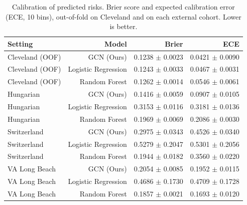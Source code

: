 \begin{table}[t]
\centering
\caption{Calibration of predicted risks. Brier score and expected calibration error (ECE, 10 bins), out-of-fold on Cleveland and on each external cohort. Lower is better.}
\label{tab:calib}
\footnotesize
\begin{tabular}{lrrr}
\toprule
Setting & Model & Brier & ECE \\
\midrule
Cleveland (OOF) & GCN (Ours) & 0.1238 $\pm$ 0.0023 & 0.0421 $\pm$ 0.0090 \\
Cleveland (OOF) & Logistic Regression & 0.1243 $\pm$ 0.0033 & 0.0467 $\pm$ 0.0031 \\
Cleveland (OOF) & Random Forest & 0.1262 $\pm$ 0.0014 & 0.0546 $\pm$ 0.0061 \\
Hungarian & GCN (Ours) & 0.1416 $\pm$ 0.0059 & 0.0907 $\pm$ 0.0105 \\
Hungarian & Logistic Regression & 0.3153 $\pm$ 0.0116 & 0.3181 $\pm$ 0.0136 \\
Hungarian & Random Forest & 0.1969 $\pm$ 0.0069 & 0.2086 $\pm$ 0.0030 \\
Switzerland & GCN (Ours) & 0.2975 $\pm$ 0.0343 & 0.4526 $\pm$ 0.0340 \\
Switzerland & Logistic Regression & 0.5279 $\pm$ 0.2047 & 0.5301 $\pm$ 0.2056 \\
Switzerland & Random Forest & 0.1944 $\pm$ 0.0182 & 0.3560 $\pm$ 0.0220 \\
VA Long Beach & GCN (Ours) & 0.2054 $\pm$ 0.0085 & 0.1952 $\pm$ 0.0115 \\
VA Long Beach & Logistic Regression & 0.4686 $\pm$ 0.1730 & 0.4709 $\pm$ 0.1728 \\
VA Long Beach & Random Forest & 0.1857 $\pm$ 0.0021 & 0.1693 $\pm$ 0.0120 \\
\bottomrule
\end{tabular}
\end{table}
